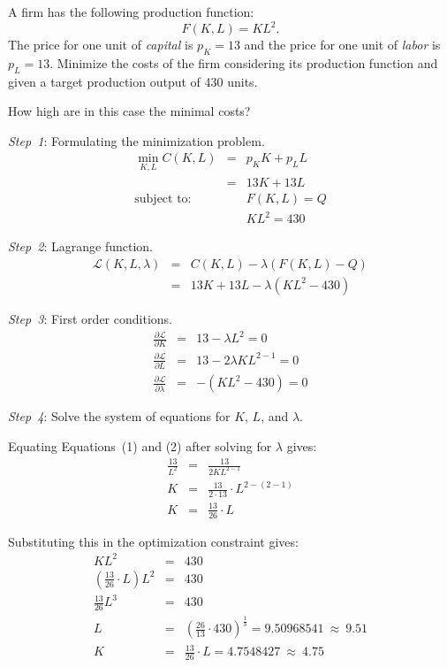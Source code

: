 

\begin{question}
A firm has the following production function: \[F(K,L)= K L^{2}.\]
The price for one unit of \emph{capital} is $p_K = 13$ 
and the price for one unit of \emph{labor} is $p_L = 13$.
Minimize the costs of the firm considering its production function and given a target production output of 430 units.

How high are in this case the minimal costs?
\end{question}

\begin{solution}
\emph{Step~1}: Formulating the minimization problem.
\begin{eqnarray*}
\min_{K,L} C(K,L) &=& p_K K + p_L L\\
 &=& 13 K + 13 L\\
\mbox{subject to:} &&  F(K,L) = Q \\
&& K L^{2} = 430 
\end{eqnarray*}

\emph{Step~2}: Lagrange function.
\begin{eqnarray*}
\mathcal{L}(K, L, \lambda) &=& C(K, L)-\lambda (F(K, L) - Q) \\
&=& 13 K + 13 L - \lambda (K L^{2} -430)
\end{eqnarray*}

\emph{Step~3}: First order conditions.
\begin{eqnarray}
\frac{\partial {\mathcal {L}}}{\partial K} & = & 13 - \lambda L^{2} = 0\\
\frac{\partial {\mathcal {L}}}{\partial L} & = & 13 - {2} \lambda K L^{2-1} = 0 \\
\frac{\partial {\mathcal {L}}}{\partial \lambda} & = & -(K L^{2}-430) = 0
\end{eqnarray}

\emph{Step~4}: Solve the system of equations for $K$, $L$, and $\lambda$.

Equating Equations~(1) and (2) after solving for $\lambda$ gives:
\begin{eqnarray*}
\frac{13}{L^{2}} & = & \frac{13}{{2} K L^{2-1}}\\
K & = & \frac{13}{2 \cdot 13} \cdot L^{2 - (2 -1)}\\
K & = & \frac{13}{26} \cdot L
\end{eqnarray*}

Substituting this in the optimization constraint gives:
\begin{eqnarray*}
K L^{2} & = & 430\\
\left(\frac{13}{26}\cdot L \right) L^{2} & = & 430\\
\frac{13}{26} L^{3} & = & 430\\
L & = & \left(\frac{26}{13} \cdot 
430\right)^{\frac{1}{3}} = 9.50968541~\approx~9.51\\
K & = & \frac{13}{26} \cdot L = 4.7548427~\approx~4.75
\end{eqnarray*}


\end{solution}
